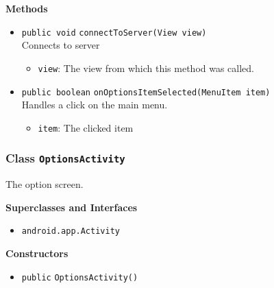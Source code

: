 \textbf{Methods}
\begin{itemize}
\item \lstinline|public void| \lstinline|connectToServer|\lstinline|(View view)|\\
Connects to server
\begin{itemize}
\item \lstinline|view|: The view from which this method was called.
\end{itemize}



\item \lstinline|public boolean| \lstinline|onOptionsItemSelected|\lstinline|(MenuItem item)|\\
Handles a click on the main menu.
\begin{itemize}
\item \lstinline|item|: The clicked item
\end{itemize}



\end{itemize}

\subsubsection{Class \lstinline|OptionsActivity|}
The option screen. \\



\textbf{Superclasses and Interfaces}
\begin{itemize}
\item \lstinline|android.app.Activity|
\end{itemize}



\textbf{Constructors}
\begin{itemize}
\item \lstinline|public| \lstinline|OptionsActivity|\lstinline|()|




\end{itemize}


